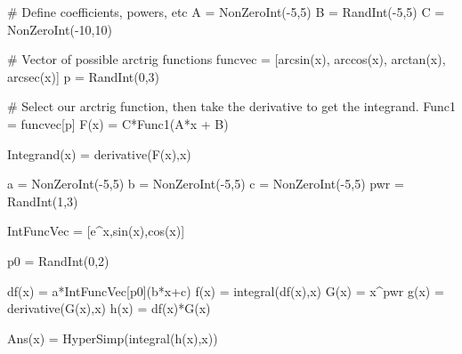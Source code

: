 \begin{sagesilent}
# Define coefficients, powers, etc
A = NonZeroInt(-5,5)
B = RandInt(-5,5)
C = NonZeroInt(-10,10)


# Vector of possible arctrig functions
funcvec = [arcsin(x), arccos(x), arctan(x), arcsec(x)]
p = RandInt(0,3)

# Select our arctrig function, then take the derivative to get the integrand.
Func1 = funcvec[p]
F(x) = C*Func1(A*x + B)

Integrand(x) = derivative(F(x),x)

\end{sagesilent}




\begin{sagesilent}
a = NonZeroInt(-5,5)
b = NonZeroInt(-5,5)
c = NonZeroInt(-5,5)
pwr = RandInt(1,3)

IntFuncVec = [e^x,sin(x),cos(x)]

p0 = RandInt(0,2)

df(x) = a*IntFuncVec[p0](b*x+c)
f(x) = integral(df(x),x)
G(x) = x^pwr 
g(x) = derivative(G(x),x)
h(x) = df(x)*G(x)

Ans(x) = HyperSimp(integral(h(x),x))

\end{sagesilent}


